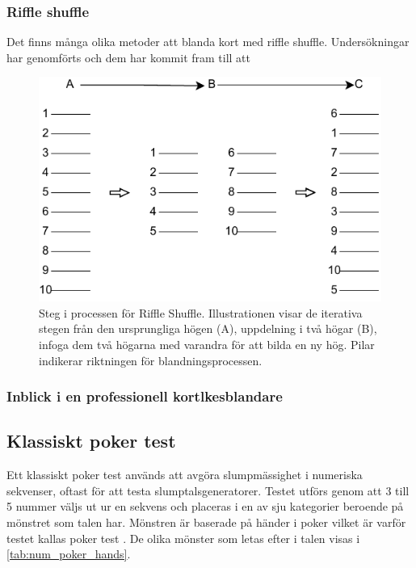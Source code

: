 \documentclass[swedish,a4paper]{article}
\begin{document}
\subsubsection{Riffle shuffle}
Det finns många olika metoder att blanda kort med riffle shuffle. Undersökningar har genomförts och dem har kommit fram till att 

\begin{figure}[H]
	\begin{center}
		\includegraphics{images/rifflle-shuffle.pdf}
	\end{center}
	\captionsetup{justification=centering,margin=2cm}
	\caption{Steg i processen för Riffle Shuffle. Illustrationen visar de
	iterativa stegen från den ursprungliga högen (A), uppdelning i två
	högar (B), infoga dem två högarna med varandra för att bilda en ny hög.
        Pilar indikerar riktningen för blandningsprocessen.}
	\label{fig:riffle_shuffle_1}
\end{figure}

\subsubsection{Inblick i en professionell kortlkesblandare}


\subsection{Klassiskt poker test}
\label{sec:poker_test}
Ett klassiskt poker test används att avgöra slump\-mässighet i numeriska 
sekvenser, oftast för att testa slumptalsgeneratorer. Testet utförs genom
att 3 till 5 nummer väljs ut ur en sekvens och placeras i en av sju
kategorier beroende på mönstret som talen har.  Mönstren är baserade på händer i poker vilket är varför testet kallas poker test \parencite{Abdel2014}. 
De olika mönster som letas efter i talen visas i \cref{tab:num_poker_hands}.
\end{document}

